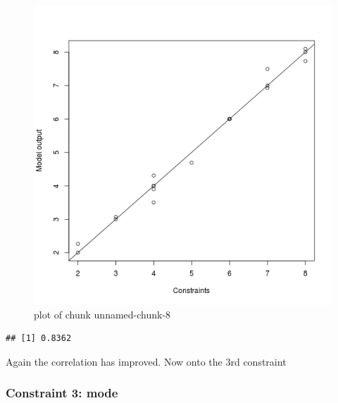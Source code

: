\begin{figure}[htbp]
\centering
\includegraphics{figure/unnamed-chunk-8.png}
\caption{plot of chunk unnamed-chunk-8}
\end{figure}

\begin{Shaded}
\begin{Highlighting}[]
\NormalTok{(}\NormalTok{(}\NormalTok{(}
\end{Highlighting}
\end{Shaded}
\begin{verbatim}
## [1] 0.8362
\end{verbatim}
Again the correlation has improved. Now onto the 3rd constraint

\subsubsection{Constraint 3: mode}

